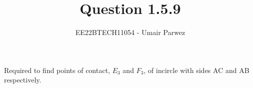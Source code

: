 \documentclass[journal,12pt,twocolumn]{IEEEtran}
\theoremstyle{remark}
\begin{document}



\vspace{3cm}

\title{
	Question 1.5.9
}

\author{
	EE22BTECH11054 - Umair Parwez
}	

\maketitle
\newpage
\bigskip

\renewcommand{\thefigure}{\theenumi}
\renewcommand{\thetable}{\theenumi}

\begin{flushleft}
	Required to find points of contact, $E_{3}$ and $F_{3}$, of incircle with sides AC and AB respectively.
\end{flushleft}
\end{document}

